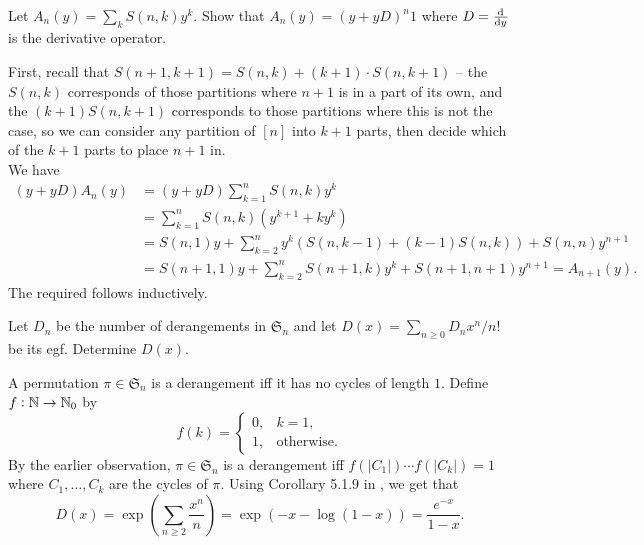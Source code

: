 	\begin{problem}
		Let $A_n(y) = \sum_{k} S(n,k) y^k$. Show that $A_n(y) = (y + yD)^n1$ where $D = \od{}{y}$ is the derivative operator.
	\end{problem}
	\begin{solution*}
		First, recall that $S(n+1,k+1) = S(n,k) + (k+1) \cdot S(n,k+1)$ -- the $S(n,k)$ corresponds of those partitions where $n+1$ is in a part of its own, and the $(k+1)S(n,k+1)$ corresponds to those partitions where this is not the case, so we can consider any partition of $[n]$ into $k+1$ parts, then decide which of the $k+1$ parts to place $n+1$ in.\\
		We have
		\begin{align*}
			(y+yD)A_n(y) &= (y+yD) \sum_{k=1}^n S(n,k) y^k \\
				&= \sum_{k=1}^n S(n,k) (y^{k+1} + ky^k) \\
				&= S(n,1) y + \sum_{k=2}^{n} y^k (S(n,k-1) + (k-1) S(n,k)) + S(n,n) y^{n+1} \\
				&= S(n+1,1) y + \sum_{k=2}^n S(n+1,k) y^k + S(n+1,n+1) y^{n+1} = A_{n+1}(y).
		\end{align*}
		The required follows inductively.
	\end{solution*}

	\begin{problem}
		Let $D_n$ be the number of derangements in $\mathfrak{S}_n$ and let $D(x) = \sum_{n \ge 0} D_n x^n/n!$ be its egf. Determine $D(x)$.
	\end{problem}
	\begin{solution*}
		A permutation $\pi \in \mathfrak{S}_n$ is a derangement iff it has no cycles of length $1$. Define $f : \mathbb{N} \to \mathbb{N}_0$ by
		\[ f(k) = \begin{cases} 0 , & k = 1, \\ 1 , & \text{otherwise.} \end{cases} \]
		By the earlier observation, $\pi \in \mathfrak{S}_n$ is a derangement iff $f(|C_1|)\cdots f(|C_k|) = 1$ where $C_1,\ldots,C_k$ are the cycles of $\pi$.
		Using Corollary 5.1.9 in \cite{ec2}, we get that
		\[ D(x) = \exp \left(\sum_{n \ge 2} \frac{x^n}{n}\right) = \exp \left( -x - \log(1-x) \right) = \frac{e^{-x}}{1-x} . \]
	\end{solution*}

